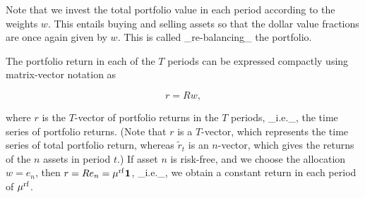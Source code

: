 Note that we invest the total portfolio value in each period according to the weights \(w\). This entails buying and selling assets so that the dollar value fractions are once again given by \(w\). This is called _re-balancing_ the portfolio.

The portfolio return in each of the \(T\) periods can be expressed compactly using matrix-vector notation as

\[r=Rw,\]

where \(r\) is the \(T\)-vector of portfolio returns in the \(T\) periods, _i.e._, the time series of portfolio returns. (Note that \(r\) is a \(T\)-vector, which represents the time series of total portfolio return, whereas \(\tilde{r}_{t}\) is an \(n\)-vector, which gives the returns of the \(n\) assets in period \(t\).) If asset \(n\) is risk-free, and we choose the allocation \(w=e_{n}\), then \(r=Re_{n}=\mu^{\rm rf}\mathbf{1}\), _i.e._, we obtain a constant return in each period of \(\mu^{\rm rf}\).

 